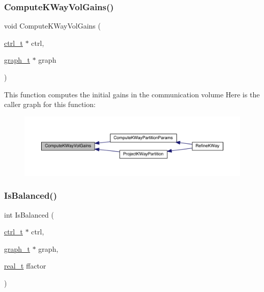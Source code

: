 \subsubsection{\texorpdfstring{Compute\+K\+Way\+Vol\+Gains()}{ComputeKWayVolGains()}}
{\footnotesize\ttfamily void Compute\+K\+Way\+Vol\+Gains (\begin{DoxyParamCaption}\item[{\hyperlink{a00742}{ctrl\+\_\+t} $\ast$}]{ctrl,  }\item[{\hyperlink{a00734}{graph\+\_\+t} $\ast$}]{graph }\end{DoxyParamCaption})}

This function computes the initial gains in the communication volume Here is the caller graph for this function\+:\nopagebreak
\begin{figure}[H]
\begin{center}
\leavevmode
\includegraphics[width=350pt]{a00915_acd248e19a1ba82c235d52479e231e2f7_icgraph}
\end{center}
\end{figure}
\mbox{\label{a00915_ae2f5446999d83461cf5763dc4946182a}} 
\subsubsection{\texorpdfstring{Is\+Balanced()}{IsBalanced()}}
{\footnotesize\ttfamily int Is\+Balanced (\begin{DoxyParamCaption}\item[{\hyperlink{a00742}{ctrl\+\_\+t} $\ast$}]{ctrl,  }\item[{\hyperlink{a00734}{graph\+\_\+t} $\ast$}]{graph,  }\item[{\hyperlink{a00876_a1924a4f6907cc3833213aba1f07fcbe9}{real\+\_\+t}}]{ffactor }\end{DoxyParamCaption})}


